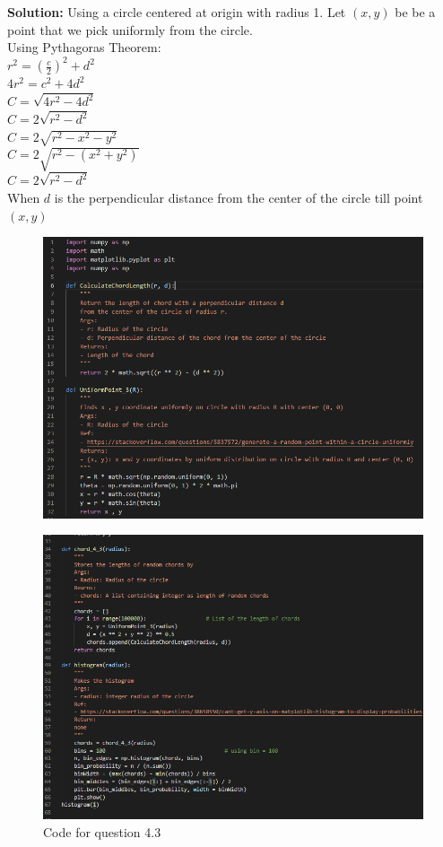\documentclass[answers]{exam}
\begin{document}
\begin{framed}
\textbf{Solution:}
Using a circle centered at origin with radius 1. 
Let $(x, y)$ be be a point that we pick uniformly from the circle. \\
Using Pythagoras Theorem: \\
$r^2 = (\frac{c}{2})^2 + d^2 $\\
$4r^2 = c^2 + 4d^2$\\
$C = \sqrt{4r^2 - 4d^2}$\\
$C = 2 \sqrt{r^2 - d^2}$ \\
$C = 2 \sqrt{r^2 - x^2 - y^2} $\\
$C = 2 \sqrt{r^2 - (x^2 + y^2)}$\\
$C = 2 \sqrt{r^2 - d^2}$\\
When $d$ is the perpendicular distance from the center of the circle till point $(x , y)$

\begin{figure}[H] %
    \centering
    \includegraphics[width= 1\textwidth]{Q4.3_code_1.PNG}
\end{figure}

\begin{figure}[H] %
    \centering
    \includegraphics[width= 1\textwidth]{Q4.3_code_2.PNG}
    \caption{Code for question 4.3}
\end{figure}


\end{framed}
\end{document}
